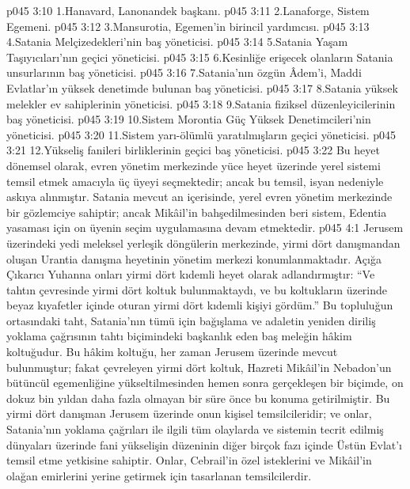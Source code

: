 \vs p045 3:10 1.\bibnobreakspace Hanavard, Lanonandek başkanı.
\vs p045 3:11 2.\bibnobreakspace Lanaforge, Sistem Egemeni.
\vs p045 3:12 3.\bibnobreakspace Mansurotia, Egemen’in birincil yardımcısı.
\vs p045 3:13 4.\bibnobreakspace Satania Melçizedekleri’nin baş yöneticisi.
\vs p045 3:14 5.\bibnobreakspace Satania Yaşam Taşıyıcıları’nın geçici yöneticisi.
\vs p045 3:15 6.\bibnobreakspace Kesinliğe erişecek olanların Satania unsurlarının baş yöneticisi.
\vs p045 3:16 7.\bibnobreakspace Satania’nın özgün Âdem’i, Maddi Evlatlar’ın yüksek denetimde bulunan baş yöneticisi.
\vs p045 3:17 8.\bibnobreakspace Satania yüksek melekler ev sahiplerinin yöneticisi.
\vs p045 3:18 9.\bibnobreakspace Satania fiziksel düzenleyicilerinin baş yöneticisi.
\vs p045 3:19 10.\bibnobreakspace Sistem Morontia Güç Yüksek Denetimcileri’nin yöneticisi.
\vs p045 3:20 11.\bibnobreakspace Sistem yarı\hyp{}ölümlü yaratılmışların geçici yöneticisi.
\vs p045 3:21 12.\bibnobreakspace Yükseliş fanileri birliklerinin geçici baş yöneticisi.
\vs p045 3:22 Bu heyet dönemsel olarak, evren yönetim merkezinde yüce heyet üzerinde yerel sistemi temsil etmek amacıyla üç üyeyi seçmektedir; ancak bu temsil, isyan nedeniyle askıya alınmıştır. Satania mevcut an içerisinde, yerel evren yönetim merkezinde bir gözlemciye sahiptir; ancak Mikâil’in bahşedilmesinden beri sistem, Edentia yasaması için on üyenin seçim uygulamasına devam etmektedir.
\vs p045 4:1 Jerusem üzerindeki yedi meleksel yerleşik döngülerin merkezinde, yirmi dört danışmandan oluşan Urantia danışma heyetinin yönetim merkezi konumlanmaktadır. Açığa Çıkarıcı Yuhanna onları yirmi dört kıdemli heyet olarak adlandırmıştır: “Ve tahtın çevresinde yirmi dört koltuk bulunmaktaydı, ve bu koltukların üzerinde beyaz kıyafetler içinde oturan yirmi dört kıdemli kişiyi gördüm.” Bu topluluğun ortasındaki taht, Satania’nın tümü için bağışlama ve adaletin yeniden diriliş yoklama çağrısının tahtı biçimindeki başkanlık eden baş meleğin hâkim koltuğudur. Bu hâkim koltuğu, her zaman Jerusem üzerinde mevcut bulunmuştur; fakat çevreleyen yirmi dört koltuk, Hazreti Mikâil’in Nebadon’un bütüncül egemenliğine yükseltilmesinden hemen sonra gerçekleşen bir biçimde, on dokuz bin yıldan daha fazla olmayan bir süre önce bu konuma getirilmiştir. Bu yirmi dört danışman Jerusem üzerinde onun kişisel temsilcileridir; ve onlar, Satania’nın yoklama çağrıları ile ilgili tüm olaylarda ve sistemin tecrit edilmiş dünyaları üzerinde fani yükselişin düzeninin diğer birçok fazı içinde Üstün Evlat’ı temsil etme yetkisine sahiptir. Onlar, Cebrail’in özel isteklerini ve Mikâil’in olağan emirlerini yerine getirmek için tasarlanan temsilcilerdir.

